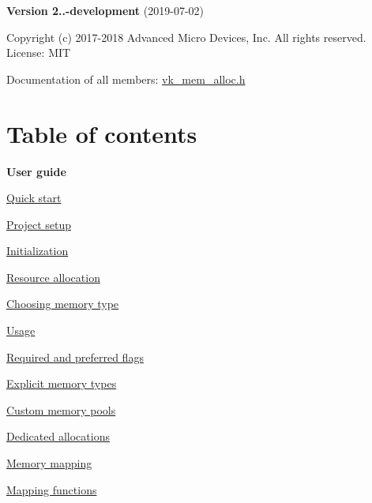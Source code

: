 {\bfseries Version 2..-\/development} (2019-\/07-\/02)

Copyright (c) 2017-\/2018 Advanced Micro Devices, Inc. All rights reserved. ~\newline
License\+: M\+IT

Documentation of all members\+: \hyperlink{vk__mem__alloc_8h_source}{vk\+\_\+mem\+\_\+alloc.\+h}\hypertarget{index_main_table_of_contents}{}\section{Table of contents}\label{index_main_table_of_contents}

\begin{DoxyItemize}
\item {\bfseries User guide}
\begin{DoxyItemize}
\item \hyperlink{quick_start}{Quick start}
\begin{DoxyItemize}
\item \hyperlink{quick_start_quick_start_project_setup}{Project setup}
\item \hyperlink{quick_start_quick_start_initialization}{Initialization}
\item \hyperlink{quick_start_quick_start_resource_allocation}{Resource allocation}
\end{DoxyItemize}
\item \hyperlink{choosing_memory_type}{Choosing memory type}
\begin{DoxyItemize}
\item \hyperlink{choosing_memory_type_choosing_memory_type_usage}{Usage}
\item \hyperlink{choosing_memory_type_choosing_memory_type_required_preferred_flags}{Required and preferred flags}
\item \hyperlink{choosing_memory_type_choosing_memory_type_explicit_memory_types}{Explicit memory types}
\item \hyperlink{choosing_memory_type_choosing_memory_type_custom_memory_pools}{Custom memory pools}
\item \hyperlink{choosing_memory_type_choosing_memory_type_dedicated_allocations}{Dedicated allocations}
\end{DoxyItemize}
\item \hyperlink{memory_mapping}{Memory mapping}
\begin{DoxyItemize}
\item \hyperlink{memory_mapping_memory_mapping_mapping_functions}{Mapping functions}

\end{DoxyItemize}
\end{DoxyItemize}
\end{DoxyItemize}
